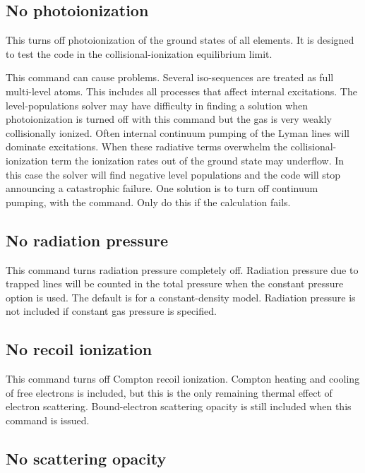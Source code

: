 \subsection{No photoionization}

This turns off photoionization of the ground states of all elements.
It is designed to test the code in the collisional-ionization equilibrium
limit.

This command can cause problems.
Several iso-sequences are treated as
full multi-level atoms.
This includes all processes that affect internal
excitations.
The level-populations solver may have difficulty in finding
a solution when photoionization is turned off with this command but the
gas is very weakly collisionally ionized.
Often internal continuum pumping
of the Lyman lines will dominate excitations.
When these radiative terms
overwhelm the collisional-ionization term the ionization rates out of the
ground state may underflow.
In this case the solver will find negative
level populations and the code will stop announcing a
catastrophic failure.
One solution is to turn off continuum pumping,
with the  command.
Only do this if the calculation fails.

\subsection{No radiation pressure}

This command turns radiation pressure completely off.
Radiation pressure
due to trapped lines will be counted in the total pressure when
the constant pressure option is used.
The default is for a constant-density model.
Radiation pressure is not included if constant gas pressure is specified.

\subsection{No recoil ionization}

This command turns off Compton recoil ionization.
Compton heating and
cooling of free electrons is included,
but this is the only remaining thermal
effect of electron scattering.
Bound-electron scattering opacity is still
included when this command is issued.

\subsection{No scattering opacity}


